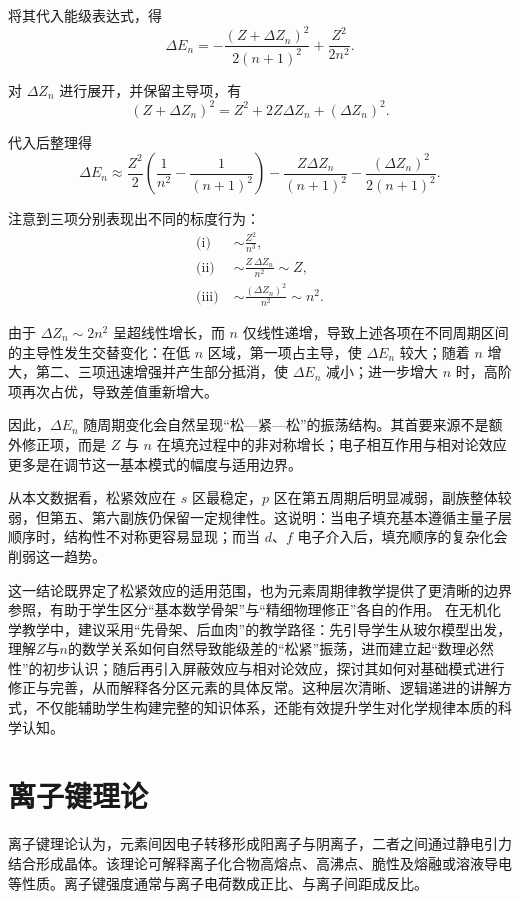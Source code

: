 \documentclass[UTF8]{ctexbook}
\begin{document}
将其代入能级表达式，得
\[
\Delta E_n = -\frac{(Z+\Delta Z_n)^2}{2(n+1)^2} + \frac{Z^2}{2n^2}.
\]

对 $\Delta Z_n$ 进行展开，并保留主导项，有
\[
(Z+\Delta Z_n)^2 = Z^2 + 2Z\Delta Z_n + (\Delta Z_n)^2.
\]

代入后整理得
\[
\Delta E_n \approx \frac{Z^2}{2}\left(\frac{1}{n^2} - \frac{1}{(n+1)^2}\right)
- \frac{Z\Delta Z_n}{(n+1)^2}
- \frac{(\Delta Z_n)^2}{2(n+1)^2}.
\]

注意到三项分别表现出不同的标度行为：
\[\begin{aligned}
\text{(i)}\;& \sim \frac{Z^2}{n^3}, \\
\text{(ii)}\;& \sim \frac{Z\,\Delta Z_n}{n^2} \sim Z, \\
\text{(iii)}\;& \sim \frac{(\Delta Z_n)^2}{n^2} \sim n^2.
\end{aligned}\]

由于 $\Delta Z_n \sim 2n^2$ 呈超线性增长，而 $n$ 仅线性递增，导致上述各项在不同周期区间的主导性发生交替变化：在低 $n$ 区域，第一项占主导，使 $\Delta E_n$ 较大；随着 $n$ 增大，第二、三项迅速增强并产生部分抵消，使 $\Delta E_n$ 减小；进一步增大 $n$ 时，高阶项再次占优，导致差值重新增大。

因此，$\Delta E_n$ 随周期变化会自然呈现“松—紧—松”的振荡结构。其首要来源不是额外修正项，而是 $Z$ 与 $n$ 在填充过程中的非对称增长；电子相互作用与相对论效应更多是在调节这一基本模式的幅度与适用边界。

从本文数据看，松紧效应在 \(s\) 区最稳定，\(p\) 区在第五周期后明显减弱，副族整体较弱，但第五、第六副族仍保留一定规律性。这说明：当电子填充基本遵循主量子层顺序时，结构性不对称更容易显现；而当 \(d\)、\(f\) 电子介入后，填充顺序的复杂化会削弱这一趋势。

这一结论既界定了松紧效应的适用范围，也为元素周期律教学提供了更清晰的边界参照，有助于学生区分“基本数学骨架”与“精细物理修正”各自的作用。
在无机化学教学中，建议采用“先骨架、后血肉”的教学路径：先引导学生从玻尔模型出发，理解$Z$与$n$的数学关系如何自然导致能级差的“松紧”振荡，进而建立起“数理必然性”的初步认识；随后再引入屏蔽效应与相对论效应，探讨其如何对基础模式进行修正与完善，从而解释各分区元素的具体反常。这种层次清晰、逻辑递进的讲解方式，不仅能辅助学生构建完整的知识体系，还能有效提升学生对化学规律本质的科学认知。
\newpage


\section{离子键理论}

离子键理论认为，元素间因电子转移形成阳离子与阴离子，二者之间通过静电引力结合形成晶体。该理论可解释离子化合物高熔点、高沸点、脆性及熔融或溶液导电等性质。离子键强度通常与离子电荷数成正比、与离子间距成反比。
\end{document}
